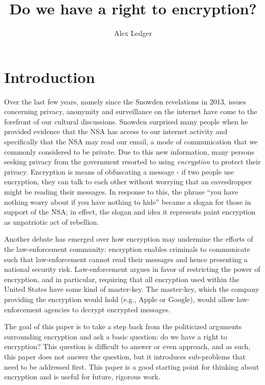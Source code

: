 \documentclass[11pt]{article}
\title{Do we have a right to encryption?}
\author{Alex Ledger}
\date{}
\begin{document}
\doublespacing


\maketitle

\section{Introduction}
Over the last few years, namely since the Snowden revelations in 2013, issues concerning privacy, anonymity and surveillance on the internet have come to the forefront of our cultural discussions.
Snowden surprised many people when he provided evidence that the NSA has access to our internet activity and specifically that the NSA may read our email, a mode of communication that we commonly considered to be private.
Due to this new information, many persons seeking privacy from the government resorted to using \textit{encryption} to protect their privacy.
Encryption is means of obfuscating a message - if two people use encryption, they can talk to each other without worrying that an eavesdropper might be reading their messages.
In response to this, the phrase ``you have nothing worry about if you have nothing to hide'' became a slogan for those in support of the NSA; in effect, the slogan and idea it represents paint encryption as unpatriotic act of rebellion.

Another debate has emerged over how encryption may undermine the efforts of the law-enforcement community: encryption enables criminals to communicate such that law-enforcement cannot read their messages and hence presenting a national security risk.
Law-enforcement argues in favor of restricting the power of encryption, and in particular, requiring that all encryption used within the United States have some kind of master-key.
The master-key, which the company providing the encryption would hold (e.g., Apple or Google), would allow law-enforcement agencies to decrypt encrypted messages.

The goal of this paper is to take a step back from the politicized arguments surrounding encryption and ask a basic question: do we have a right to encryption?
This question is difficult to answer or even approach, and as such, this paper does not answer the question, but it introduces sub-problems that need to be addressed first.
This paper is a good starting point for thinking about encryption and is useful for future, rigorous work.
\end{document}
